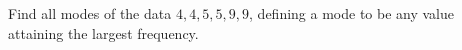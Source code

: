 Find all modes of the data $4,4,5,5,9,9$, defining a mode to be any value attaining the largest frequency.

